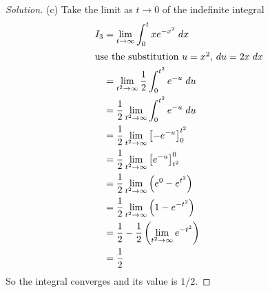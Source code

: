 \begin{proof}[Solution]
(c) Take the limit as $t\to 0$ of the indefinite integral
\begin{align*}
I_3&=\lim_{t\to\infty}\int_0^t xe^{-x^2}\;dx\\
\shortintertext{use the substitution $u=x^2$, $du=2x\;dx$}
   &=\lim_{t^2\to\infty}\frac{1}{2}\int_0^{t^2} e^{-u}\;du\\
   &=\frac{1}{2}\lim_{t^2\to\infty}\int_0^{t^2}e^{-u}\;du\\
   &=\frac{1}{2}\lim_{t^2\to\infty}\left[-e^{-u}\right]_0^{t^2}\\
   &=\frac{1}{2}\lim_{t^2\to\infty}\left[e^{-u}\right]_{t^2}^0\\
   &=\frac{1}{2}\lim_{t^2\to\infty}\left(e^0-e^{t^2}\right)\\
   &=\frac{1}{2}\lim_{t^2\to\infty}\left(1-e^{-t^2}\right)\\
   &=\frac{1}{2}-\frac{1}{2}\left(\lim_{t^2\to\infty}e^{-t^2}\right)\\
   &=\frac{1}{2}
\end{align*}
So the integral converges and its value is $1/2$.
\end{proof}
